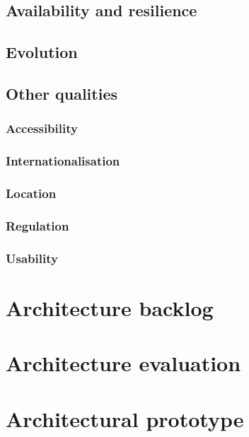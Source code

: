 \documentclass[a4paper,11pt]{report}
\begin{document}
\section{Availability and resilience}
\label{sec:avail-resil}



\section{Evolution}
\label{sec:evolution}


\section{Other qualities}
\label{sec:other-qualities}

\subsection{Accessibility}
\label{sec:accessibility}


\subsection{Internationalisation}
\label{sec:internationalisation}


\subsection{Location}
\label{sec:location}


\subsection{Regulation}
\label{sec:regulation}


\subsection{Usability}
\label{sec:usability}


\appendix

\chapter{Architecture backlog}
\label{cha:architecture-backlog}
\thispagestyle{fancy}


\chapter{Architecture evaluation}
\label{cha:arch-eval}
\thispagestyle{fancy}


\chapter{Architectural prototype}
\label{cha:arch-prot}
\thispagestyle{fancy}





%
%


\end{document}
